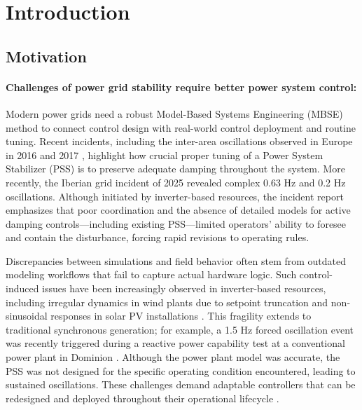 \section{Introduction}

\subsection{Motivation}

\paragraph{Challenges of power grid stability require better power system control:} Modern power grids need a robust Model-Based Systems Engineering (MBSE) method to connect control design with real-world control deployment and routine tuning. Recent incidents, including the inter-area oscillations observed in Europe in 2016 and 2017 \cite{ENTSOE_2016, ENTSOE_2017}, highlight how crucial proper tuning of a Power System Stabilizer (PSS) is to preserve adequate damping throughout the system. More recently, the Iberian grid incident of 2025 \cite{ENTSOE_Iberian_Factual_2025, ENTSOE_Iberian_2026} revealed complex 0.63 Hz and 0.2 Hz oscillations. Although initiated by inverter-based resources, the incident report emphasizes that poor coordination and the absence of detailed models for active damping controls—including existing PSS—limited operators’ ability to foresee and contain the disturbance, forcing rapid revisions to operating rules.

Discrepancies between simulations and field behavior often stem from outdated modeling workflows that fail to capture actual hardware logic. Such control-induced issues have been increasingly observed in inverter-based resources, including irregular dynamics in wind plants due to setpoint truncation \cite{Pudasaini2026} and non-sinusoidal responses in solar PV installations \cite{Mishra2026}. This fragility extends to traditional synchronous generation; for example, a 1.5 Hz forced oscillation event was recently triggered during a reactive power capability test at a conventional power plant in Dominion \cite{Mishra2024_Greensville}. Although the power plant model was accurate, the PSS was not designed for the specific operating condition encountered, leading to sustained oscillations. These challenges demand adaptable controllers that can be redesigned and deployed throughout their operational lifecycle \cite{Bombois2024, Lauria2024_SEGAN}.

